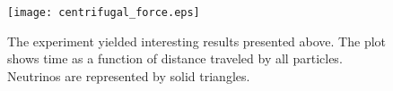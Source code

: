 \documentclass[11pt,letterpaper,onecolumn]{article}
\begin{document}
\begin{figure}[h]
 \begin{center}
 \texttt{[image: centrifugal\_force.eps]}
 \caption{ The experiment yielded interesting results presented above. 
 The plot shows time as a function of distance traveled by all particles.
 Neutrinos are represented by solid triangles.~\label{fig:results} }
 \end{center}
\end{figure}


%
%
\end{document}
